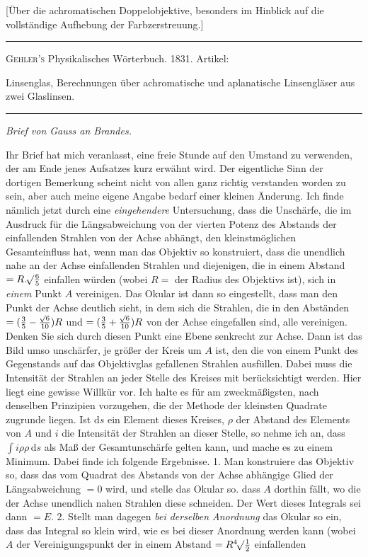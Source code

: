 \expandafter\def\csname HistoricalNoteText515\endcsname{[Über die achromatischen Doppelobjektive, besonders im Hinblick auf die vollständige Aufhebung der Farbzerstreuung.]}
\begin{center}
\hrule\vspace{2mm}
\textsc{Gehler's} Physikalisches Wörterbuch. 1831. Artikel:\par
Linsenglas, Berechnungen über achromatische und aplanatische Linsengläser aus zwei Glaslinsen.
\vspace{2mm}\hrule\vspace{5mm}
{\large\itshape Brief von Gauss an Brandes.\par}
\end{center}
Ihr Brief hat mich veranlasst, eine freie Stunde auf den Umstand zu verwenden, der am Ende jenes Aufsatzes kurz erwähnt wird. Der eigentliche Sinn der dortigen Bemerkung scheint nicht von allen ganz richtig verstanden worden zu sein, aber auch meine eigene Angabe bedarf einer kleinen Änderung. Ich finde nämlich jetzt durch eine \textit{eingehendere} Untersuchung, dass die Unschärfe, die im Ausdruck für die Längsabweichung von der vierten Potenz des Abstands der einfallenden Strahlen von der Achse abhängt, den kleinstmöglichen Gesamteinfluss hat, wenn man das Objektiv so konstruiert, dass die unendlich nahe an der Achse einfallenden Strahlen und diejenigen, die in einem Abstand $=R.\BareRoot{\tfrac65}$ einfallen würden (wobei $R=$ der Radius des Objektivs ist), sich in \textit{einem} Punkt $A$ vereinigen. Das Okular ist dann so eingestellt, dass man den Punkt der Achse deutlich sieht, in dem sich die Strahlen, die in den Abständen $=(\tfrac35-\tfrac{\BareRoot{6}}{10})R$ und $=(\tfrac35+\tfrac{\BareRoot{6}}{10})R$ von der Achse eingefallen sind, alle vereinigen. Denken Sie sich durch diesen Punkt eine Ebene senkrecht zur Achse. Dann ist das Bild umso unschärfer, je größer der Kreis um $A$ ist, den die von einem Punkt des Gegenstands auf das Objektivglas gefallenen Strahlen ausfüllen. Dabei muss die Intensität der Strahlen an jeder Stelle des Kreises mit berücksichtigt werden. Hier liegt eine gewisse Willkür vor. Ich halte es für am zweckmäßigsten, nach denselben Prinzipien vorzugehen, die der Methode der kleinsten Quadrate zugrunde liegen. Ist $\mathrm{d}s$ ein Element dieses Kreises, $\rho$ der Abstand des Elements von $A$ und $i$ die Intensität der Strahlen an dieser Stelle, so nehme ich an, dass $\int i\rho\rho\,\mathrm{d}s$ als Maß der Gesamtunschärfe gelten kann, und mache es zu einem Minimum. Dabei finde ich folgende Ergebnisse. 1. Man konstruiere das Objektiv so, dass das vom Quadrat des Abstands von der Achse abhängige Glied der Längsabweichung $=0$ wird, und stelle das Okular so. dass $A$ dorthin fällt, wo die der Achse unendlich nahen Strahlen diese schneiden. Der Wert dieses Integrals sei dann $=E$. 2. Stellt man dagegen \textit{bei derselben Anordnung} das Okular so ein, dass das Integral so klein wird, wie es bei dieser Anordnung werden kann (wobei $A$ der Vereinigungspunkt der in einem Abstand $=R\BareRoot[4]{\tfrac12}$ einfallenden 